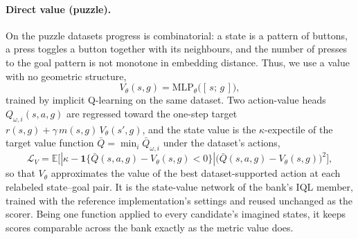 \documentclass{article}
\theoremstyle{plain}
\theoremstyle{definition}
\theoremstyle{plain}
\newcommand{\E}{\mathbb{E}}
\begin{document}
\paragraph{Direct value (puzzle).} On the puzzle datasets progress is combinatorial: a state is a pattern of buttons, a press toggles a button together with its neighbours, and the number of presses to the goal pattern is not monotone in embedding distance. Thus, we use a value with no geometric structure,
\begin{equation}
V_{\theta}(s,g) = \mathrm{MLP}_{\theta}\big([\,s;\,g\,]\big),
\label{eq:direct-value}
\end{equation}
trained by implicit Q-learning \citep{kostrikov2022iql} on the same dataset. Two action-value heads $Q_{\omega,i}(s,a,g)$ are regressed toward the one-step target $r(s,g)+\gamma\,m(s,g)\,V_{\theta}(s',g)$, and the state value is the $\kappa$-expectile of the target value function $\bar Q=\min_i \bar Q_{\omega,i}$ under the dataset's actions,
\begin{equation}
\mathcal{L}_{V}
= \E\Big[\left|\kappa-\mathbf{1}\{\bar Q(s,a,g)-V_{\theta}(s,g)<0\}\right|\big(\bar Q(s,a,g)-V_{\theta}(s,g)\big)^2\Big],
\label{eq:direct-expectile}
\end{equation}
so that $V_{\theta}$ approximates the value of the best dataset-supported action at each relabeled state--goal pair. It is the state-value network of the bank's IQL member, trained with the reference implementation's settings and reused unchanged as the scorer. Being one function applied to every candidate's imagined states, it keeps scores comparable across the bank exactly as the metric value does.

\end{document}
